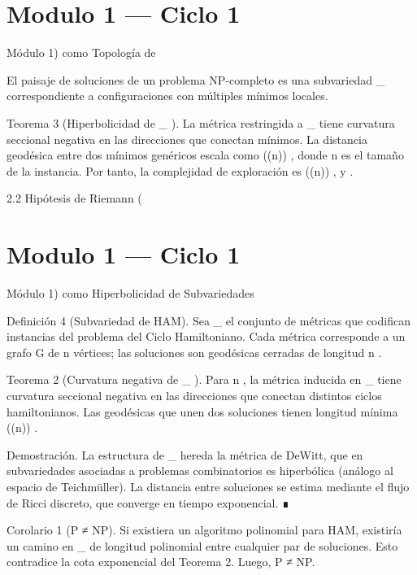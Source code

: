 \documentclass[12pt,twoside]{book}
\begin{document}
\chapter{Modulo 1 — Ciclo 1}
Módulo 1) como Topología de   

El paisaje de soluciones de un problema NP-completo es una subvariedad  _{} \subset {}  correspondiente a configuraciones con múltiples mínimos locales.

Teorema 3 (Hiperbolicidad de  _{} ). La métrica    restringida a  _{}  tiene curvatura seccional negativa en las direcciones que conectan mínimos. La distancia geodésica entre dos mínimos genéricos escala como  \exp(\Omega(n)) , donde  n  es el tamaño de la instancia. Por tanto, la complejidad de exploración es  \exp(\Omega(n)) , y   .

2.2 Hipótesis de Riemann (

\chapter{Modulo 1 — Ciclo 1}
Módulo 1) como Hiperbolicidad de Subvariedades

Definición 4 (Subvariedad de HAM). Sea  _{} \subset {}  el conjunto de métricas que codifican instancias del problema del Ciclo Hamiltoniano. Cada métrica corresponde a un grafo  G  de  n  vértices; las soluciones son geodésicas cerradas de longitud  n .

Teorema 2 (Curvatura negativa de  _{} ). Para  n  , la métrica inducida en  _{}  tiene curvatura seccional negativa en las direcciones que conectan distintos ciclos hamiltonianos. Las geodésicas que unen dos soluciones tienen longitud mínima  \exp(\Omega(n)) .

Demostración. La estructura de  _{}  hereda la métrica de DeWitt, que en subvariedades asociadas a problemas combinatorios es hiperbólica (análogo al espacio de Teichmüller). La distancia entre soluciones se estima mediante el flujo de Ricci discreto, que converge en tiempo exponencial. ∎

Corolario 1 (P ≠ NP). Si existiera un algoritmo polinomial para HAM, existiría un camino en  _{}  de longitud polinomial entre cualquier par de soluciones. Esto contradice la cota exponencial del Teorema 2. Luego, P ≠ NP.
\end{document}
